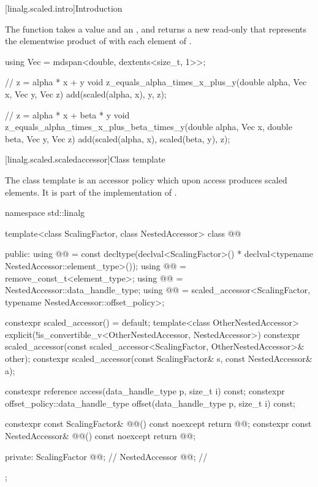 [linalg.scaled.intro]{Introduction}

\pnum
The  function
takes a value  and an  , and
returns a new read-only 
that represents
the elementwise product of  with each element of .
\begin{example}
\begin{codeblock}
using Vec = mdspan<double, dextents<size_t, 1>>;

// z = alpha * x + y
void z_equals_alpha_times_x_plus_y(double alpha, Vec x, Vec y, Vec z) {
  add(scaled(alpha, x), y, z);
}

// z = alpha * x + beta * y
void z_equals_alpha_times_x_plus_beta_times_y(double alpha, Vec x, double beta, Vec y, Vec z) {
  add(scaled(alpha, x), scaled(beta, y), z);
}
\end{codeblock}
\end{example}

[linalg.scaled.scaledaccessor]{Class template }

\pnum
The class template  is an  accessor policy
which upon access produces scaled elements.
It is part of the implementation of .
\begin{codeblock}
namespace std::linalg {
  template<class ScalingFactor, class NestedAccessor>
  class @@ {
  public:
    using @@ =
      const decltype(declval<ScalingFactor>() *
                     declval<typename NestedAccessor::element_type>());
    using @@ = remove_const_t<element_type>;
    using @@ = NestedAccessor::data_handle_type;
    using @@ = scaled_accessor<ScalingFactor, typename NestedAccessor::offset_policy>;

    constexpr scaled_accessor() = default;
    template<class OtherNestedAccessor>
      explicit(!is_convertible_v<OtherNestedAccessor, NestedAccessor>)
        constexpr scaled_accessor(const scaled_accessor<ScalingFactor,
                                                        OtherNestedAccessor>& other);
    constexpr scaled_accessor(const ScalingFactor& s, const NestedAccessor& a);

    constexpr reference access(data_handle_type p, size_t i) const;
    constexpr offset_policy::data_handle_type offset(data_handle_type p, size_t i) const;

    constexpr const ScalingFactor& @@() const noexcept { return @@; }
    constexpr const NestedAccessor& @@() const noexcept { return @@; }

  private:
    ScalingFactor @@{};                              // \expos
    NestedAccessor @@{};                            // \expos
  };
}
\end{codeblock}

